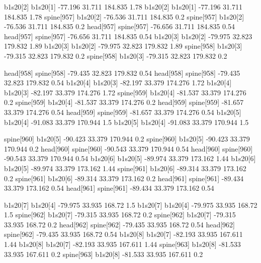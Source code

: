 b1s20[2]    b1s20[1]    -77.196    31.711    184.835    1.78
b1s20[2]    b1s20[1]    -77.196    31.711    184.835    1.78
spine[957]    b1s20[2]    -76.536    31.711    184.835    0.2
spine[957]    b1s20[2]    -76.536    31.711    184.835    0.2
head[957]    spine[957]    -76.656    31.711    184.835    0.54
head[957]    spine[957]    -76.656    31.711    184.835    0.54
b1s20[3]    b1s20[2]    -79.975    32.823    179.832    1.89
b1s20[3]    b1s20[2]    -79.975    32.823    179.832    1.89
spine[958]    b1s20[3]    -79.315    32.823    179.832    0.2
spine[958]    b1s20[3]    -79.315    32.823    179.832    0.2


head[958]    spine[958]    -79.435    32.823    179.832    0.54
head[958]    spine[958]    -79.435    32.823    179.832    0.54
b1s20[4]    b1s20[3]    -82.197    33.379    174.276    1.72
b1s20[4]    b1s20[3]    -82.197    33.379    174.276    1.72
spine[959]    b1s20[4]    -81.537    33.379    174.276    0.2
spine[959]    b1s20[4]    -81.537    33.379    174.276    0.2
head[959]    spine[959]    -81.657    33.379    174.276    0.54
head[959]    spine[959]    -81.657    33.379    174.276    0.54
b1s20[5]    b1s20[4]    -91.083    33.379    170.944    1.5
b1s20[5]    b1s20[4]    -91.083    33.379    170.944    1.5


spine[960]    b1s20[5]    -90.423    33.379    170.944    0.2
spine[960]    b1s20[5]    -90.423    33.379    170.944    0.2
head[960]    spine[960]    -90.543    33.379    170.944    0.54
head[960]    spine[960]    -90.543    33.379    170.944    0.54
b1s20[6]    b1s20[5]    -89.974    33.379    173.162    1.44
b1s20[6]    b1s20[5]    -89.974    33.379    173.162    1.44
spine[961]    b1s20[6]    -89.314    33.379    173.162    0.2
spine[961]    b1s20[6]    -89.314    33.379    173.162    0.2
head[961]    spine[961]    -89.434    33.379    173.162    0.54
head[961]    spine[961]    -89.434    33.379    173.162    0.54


b1s20[7]    b1s20[4]    -79.975    33.935    168.72    1.5
b1s20[7]    b1s20[4]    -79.975    33.935    168.72    1.5
spine[962]    b1s20[7]    -79.315    33.935    168.72    0.2
spine[962]    b1s20[7]    -79.315    33.935    168.72    0.2
head[962]    spine[962]    -79.435    33.935    168.72    0.54
head[962]    spine[962]    -79.435    33.935    168.72    0.54
b1s20[8]    b1s20[7]    -82.193    33.935    167.611    1.44
b1s20[8]    b1s20[7]    -82.193    33.935    167.611    1.44
spine[963]    b1s20[8]    -81.533    33.935    167.611    0.2
spine[963]    b1s20[8]    -81.533    33.935    167.611    0.2


